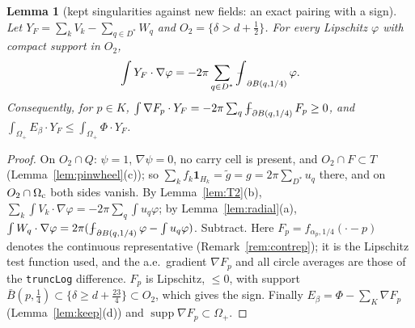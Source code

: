 \documentclass[11pt]{article}
\newtheorem{lemma}[theorem]{Lemma}
\theoremstyle{definition}
\theoremstyle{remark}
\newcommand{\dep}{\delta}
\newcommand{\avg}{\fint}
\DeclareMathOperator{\supp}{supp}
\def\fint{\mathop{\,\rlap{--}\!\!\int}\nolimits}
\begin{document}
\begin{lemma}[kept singularities against new fields: an exact pairing with a sign]\label{lem:sign}
Let $Y_F=\sum_kV_k-\sum_{q\in D^\ast}W_q$ and $O_2=\{\dep>d+\frac12\}$. For every Lipschitz $\varphi$ with compact support in $O_2$,
\[
\int Y_F\cdot\nabla\varphi=-2\pi\sum_{q\in D^\ast}\avg_{\partial B(q,1/4)}\varphi .
\]
Consequently, for $p\in K$, $\int\nabla F_p\cdot Y_F=-2\pi\sum_q\avg_{\partial B(q,1/4)}F_p\ge0$, and $\int_{\Omega_+}E_\beta\cdot Y_F\le\int_{\Omega_+}\Phi\cdot Y_F$.
\end{lemma}
\begin{proof}
On $O_2\cap Q$: $\psi=1$, $\nabla\psi=0$, no carry cell is present, and $O_2\cap F\subset T$ (Lemma~\ref{lem:pinwheel}(c)); so
$\sum_kf_k\mathbf 1_{H_k}=\tilde g=g=2\pi\sum_{D^\ast}u_q$ there, and on $O_2\cap\Omega_{\rm c}$ both sides vanish. By Lemma~\ref{lem:T2}(b),
$\sum_k\int V_k\cdot\nabla\varphi=-2\pi\sum_q\int u_q\varphi$; by Lemma~\ref{lem:radial}(a), $\int W_q\cdot\nabla\varphi=2\pi(\avg_{\partial B(q,1/4)}\varphi-\int u_q\varphi)$. Subtract.
Here $F_p=f_{\alpha_p,1/4}(\cdot-p)$ denotes the continuous representative (Remark~\ref{rem:contrep}); it is the Lipschitz test function used, and the
a.e.\ gradient $\nabla F_p$ and all circle averages are those of the \texttt{truncLog} difference. $F_p$ is Lipschitz, $\le0$, with support $\bar B(p,\frac14)\subset\{\dep\ge d+\frac{23}4\}\subset O_2$, which gives the sign. Finally
$E_\beta=\Phi-\sum_K\nabla F_p$ (Lemma~\ref{lem:keep}(d)) and $\supp\nabla F_p\subset\Omega_+$.
\end{proof}
\end{document}
